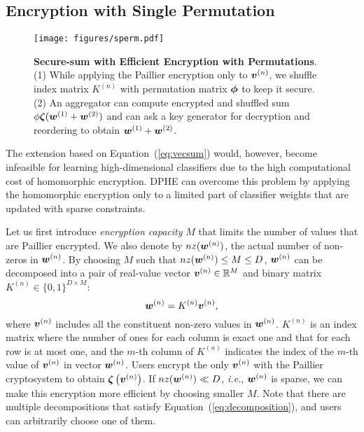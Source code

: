 \documentclass[10pt,twocolumn,letterpaper]{article}
\def\vct#1{\mbox{\boldmath $#1$}}
\def\ie{{\it i.e.}}
\def\ui#1{^{(#1)}}
\def\perm{\vct{\phi}}
\def\he#1{\vct{\zeta}\left(#1\right)}
\def\hes#1{\vct{\zeta}(#1)}
\def\nz#1{nz(#1)}
\begin{document}
\subsection{Encryption with Single Permutation}
\label{subsec:dperm}
\begin{figure}[t]
\centering
\texttt{[image: figures/sperm.pdf]}
\caption{{\bf Secure-sum with Efficient Encryption with Permutations}. (1) While applying the Paillier encryption only to $\vct{v}\ui{n}$, we shuffle index matrix $K\ui{n}$ with permutation matrix $\perm$ to keep it secure. (2) An aggregator can compute encrypted and shuffled sum $\phi\hes{\vct{w}\ui{1} + \vct{w}\ui{2}}$ and can ask a key generator for decryption and reordering to obtain $\vct{w}\ui{1} + \vct{w}\ui{2}$.}
\label{fig:sperm}
\end{figure}

The extension based on Equation~(\ref{eq:vecsum}) would, however, become infeasible for learning high-dimensional classifiers due to the high computational cost of homomorphic encryption. DPHE can overcome this problem by applying the homomorphic encryption only to a limited part of classifier weights that are updated with sparse constraints. 

Let us first introduce \emph{encryption capacity} $M$ that limits the number of values that are Paillier encrypted. We also denote by $\nz{\vct{w}\ui{n}}$, the actual number of non-zeros in $\vct{w}\ui{n}$. By choosing $M$ such that $\nz{\vct{w}\ui{n}}\leq M \leq D$, $\vct{w}\ui{n}$ can be decomposed into a pair of real-value vector $\vct{v}\ui{n}\in\mathbb{R}^{M}$ and binary matrix $K\ui{n}\in\{0, 1\}^{D\times {M}}$:
\begin{equation}
\vct{w}\ui{n} = K\ui{n}\vct{v}\ui{n},
\label{eq:decomposition}
\end{equation}
where $\vct{v}\ui{n}$ includes all the constituent non-zero values in $\vct{w}\ui{n}$. $K\ui{n}$ is an index matrix where the number of ones for each column is exact one and that for each row is at most one, and the $m$-th column of $K\ui{n}$ indicates the index of the $m$-th value of $\vct{v}\ui{n}$ in vector $\vct{w}\ui{n}$. Users encrypt the only $\vct{v}\ui{n}$ with the Paillier cryptosystem to obtain $\he{\vct{v}\ui{n}}$. If $\nz{\vct{w}\ui{n}}\ll D$, \ie, $\vct{w}\ui{n}$ is sparse, we can make this encryption more efficient by choosing smaller $M$. Note that there are multiple decompositions that satisfy Equation~(\ref{eq:decomposition}), and users can arbitrarily choose one of them. 
\end{document}
